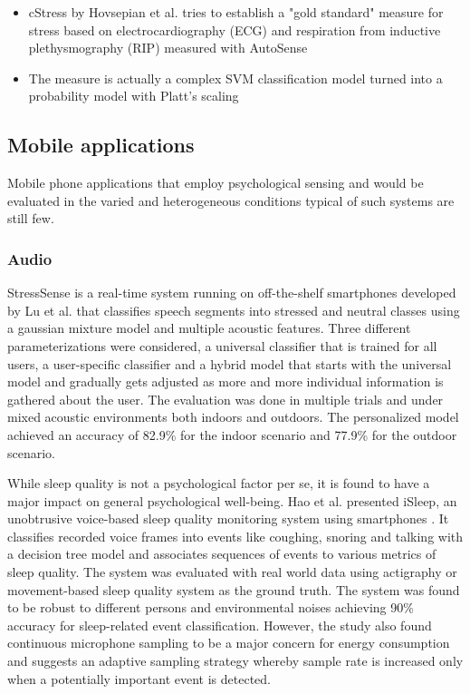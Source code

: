 \begin{itemize}
  \item cStress by Hovsepian et al. \cite{hovsepian15cstress} tries to
    establish a "gold standard" measure for stress based on electrocardiography
    (ECG) and respiration from inductive plethysmography (RIP) measured with
    AutoSense \cite{ertin11autosense}
  \item The measure is actually a complex SVM classification model turned into
    a probability model with Platt's scaling \cite{platt99probabilistic}
\end{itemize}

\subsection{Mobile applications}

Mobile phone applications that employ psychological sensing and
would be evaluated in the varied and heterogeneous conditions typical of such
systems are still few.

\subsubsection{Audio}

StressSense is a real-time system running on off-the-shelf smartphones developed
by Lu et al. that classifies speech segments
into stressed and neutral classes using a gaussian mixture model and multiple
acoustic features.
\cite{lu12stresssense}
Three different parameterizations were considered, a
universal classifier that is trained for all users, a user-specific classifier
and a hybrid model that starts with the universal model and gradually
gets adjusted as more and more individual information is gathered about the
user. The evaluation was done in multiple trials and under mixed acoustic
environments both indoors and outdoors. The personalized model achieved an
accuracy of 82.9\% for the indoor scenario and 77.9\% for the outdoor scenario.

While sleep quality is not a psychological factor per se, it is found to have
a major impact on general psychological well-being.
Hao et al. presented iSleep, an unobtrusive voice-based sleep quality monitoring
system using smartphones
\cite{hao13isleep}.
It classifies recorded voice frames into events like
coughing, snoring and talking with a decision tree model and associates
sequences of events to various metrics of sleep quality. The system was
evaluated with real world data using actigraphy or movement-based sleep quality
system as the ground truth. The system was found to be robust to different
persons and environmental noises achieving 90\% accuracy for sleep-related
event classification. However, the study also found continuous microphone sampling to
be a major concern for energy consumption and suggests an adaptive sampling
strategy whereby sample rate is increased only when a potentially important
event is detected.

